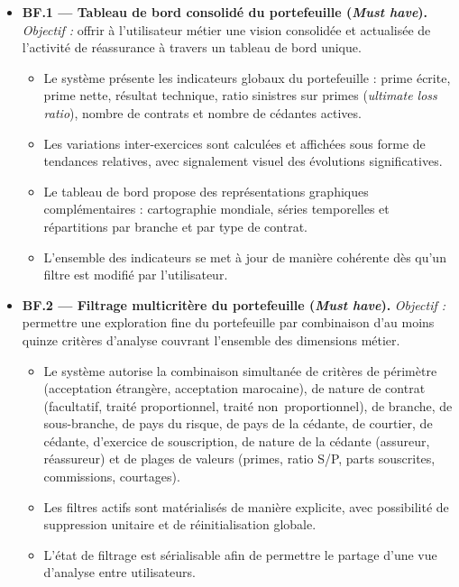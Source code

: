 \documentclass[../main.tex]{subfiles}
\begin{document}
\begin{itemize}[leftmargin=1.5cm, itemsep=6pt]

  \item \textbf{BF.1 --- Tableau de bord consolidé du portefeuille (\textit{Must have}).}
  \emph{Objectif :} offrir à l'utilisateur métier une vision consolidée et actualisée de l'activité de réassurance à travers un tableau de bord unique.
  \begin{itemize}[label=\textendash, itemsep=2pt]
    \item Le système présente les indicateurs globaux du portefeuille : prime écrite, prime nette, résultat technique, ratio sinistres sur primes (\textit{ultimate loss ratio}), nombre de contrats et nombre de cédantes actives.
    \item Les variations inter-exercices sont calculées et affichées sous forme de tendances relatives, avec signalement visuel des évolutions significatives.
    \item Le tableau de bord propose des représentations graphiques complémentaires : cartographie mondiale, séries temporelles et répartitions par branche et par type de contrat.
    \item L'ensemble des indicateurs se met à jour de manière cohérente dès qu'un filtre est modifié par l'utilisateur.
  \end{itemize}

  \item \textbf{BF.2 --- Filtrage multicritère du portefeuille (\textit{Must have}).}
  \emph{Objectif :} permettre une exploration fine du portefeuille par combinaison d'au moins quinze critères d'analyse couvrant l'ensemble des dimensions métier.
  \begin{itemize}[label=\textendash, itemsep=2pt]
    \item Le système autorise la combinaison simultanée de critères de périmètre (acceptation étrangère, acceptation marocaine), de nature de contrat (facultatif, traité proportionnel, traité non~proportionnel), de branche, de sous-branche, de pays du risque, de pays de la cédante, de courtier, de cédante, d'exercice de souscription, de nature de la cédante (assureur, réassureur) et de plages de valeurs (primes, ratio S/P, parts souscrites, commissions, courtages).
    \item Les filtres actifs sont matérialisés de manière explicite, avec possibilité de suppression unitaire et de réinitialisation globale.
    \item L'état de filtrage est sérialisable afin de permettre le partage d'une vue d'analyse entre utilisateurs.
  \end{itemize}


\end{itemize}
\end{document}
